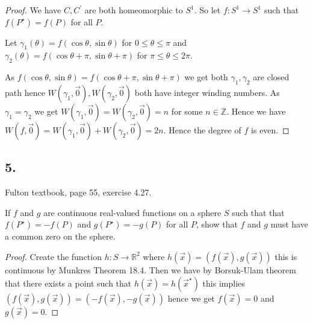 \documentclass{amsart}
\theoremstyle{plain}
\theoremstyle{definition}
\theoremstyle{remark}
\begin{document}
\begin{proof}
We have $C,C^\prime$ are both homeomorphic to $S^1$. So let $f:S^1\to S^1$ such that $f(P^\star)=f(P)$ for all $P$. 

Let $\gamma_1(\theta)=f(\cos \theta ,\sin \theta )$ for $0\leq \theta \leq \pi $ and $\gamma_2(\theta)=f(\cos \theta +\pi , \sin \theta+\pi)$ for $\pi \leq \theta \leq 2\pi$. 

As $f(\cos \theta,\sin \theta )=f(\cos \theta+\pi,\sin \theta+\pi)$ we get both $\gamma_1,\gamma_2$ are closed path hence $W(\gamma_1,\vec 0),W(\gamma_2,\vec 0)$ both have integer winding numbers. As $\gamma_1=\gamma_2$ we get $W(\gamma_1,\vec 0)=W(\gamma_2,\vec 0)=n$ for some $n\in \mathbb Z$. Hence we have $W(f,\vec 0)=W(\gamma_1,\vec 0)+W(\gamma_2,\vec 0)=2n$. Hence the degree of $f$ is even.

\end{proof}

\vspace{.15in}
\noindent
\subsection*{5.} Fulton textbook, page 55, exercise 4.27.

If $f$ and $g$ are continuous real-valued functions on a sphere $S$ such that that $f(P^\star)=-f(P)$ and $g(P^\star)=-g(P)$ for all $P$, show that $f$ and $g$ must have a common zero on the sphere. 

\begin{proof}
    Create the function $h:S\to \mathbb{R}^2$ where $h(\vec x)=(f(\vec x),g(\vec x))$ this is continuous by Munkres Theorem 18.4. Then we have by Borsuk-Ulam theorem that there exists a point such that $h(\vec x)=h(\vec x^\star)$ this implies $(f(\vec x),g(\vec x))=(-f(\vec x),-g(\vec x))$ hence we get $f(\vec x)= 0$ and $g(\vec x)=0$.
\end{proof}

 
\end{document}

